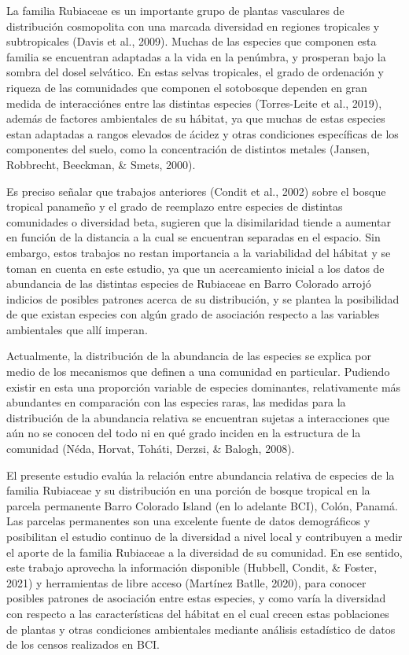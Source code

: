 \documentclass[11pt,]{article}
\begin{document}
La familia Rubiaceae es un importante grupo de plantas vasculares de
distribución cosmopolita con una marcada diversidad en regiones
tropicales y subtropicales (Davis et al., 2009). Muchas de las especies
que componen esta familia se encuentran adaptadas a la vida en la
penúmbra, y prosperan bajo la sombra del dosel selvático. En estas
selvas tropicales, el grado de ordenación y riqueza de las comunidades
que componen el sotobosque dependen en gran medida de interacciónes
entre las distintas especies (Torres-Leite et al., 2019), además de
factores ambientales de su hábitat, ya que muchas de estas especies
estan adaptadas a rangos elevados de ácidez y otras condiciones
específicas de los componentes del suelo, como la concentración de
distintos metales (Jansen, Robbrecht, Beeckman, \& Smets, 2000).

Es preciso señalar que trabajos anteriores (Condit et al., 2002) sobre
el bosque tropical panameño y el grado de reemplazo entre especies de
distintas comunidades o diversidad beta, sugieren que la disimilaridad
tiende a aumentar en función de la distancia a la cual se encuentran
separadas en el espacio. Sin embargo, estos trabajos no restan
importancia a la variabilidad del hábitat y se toman en cuenta en este
estudio, ya que un acercamiento inicial a los datos de abundancia de las
distintas especies de Rubiaceae en Barro Colorado arrojó indicios de
posibles patrones acerca de su distribución, y se plantea la posibilidad
de que existan especies con algún grado de asociación respecto a las
variables ambientales que allí imperan.

Actualmente, la distribución de la abundancia de las especies se explica
por medio de los mecanismos que definen a una comunidad en particular.
Pudiendo existir en esta una proporción variable de especies dominantes,
relativamente más abundantes en comparación con las especies raras, las
medidas para la distribución de la abundancia relativa se encuentran
sujetas a interacciones que aún no se conocen del todo ni en qué grado
inciden en la estructura de la comunidad (Néda, Horvat, Toháti, Derzsi,
\& Balogh, 2008).

El presente estudio evalúa la relación entre abundancia relativa de
especies de la familia Rubiaceae y su distribución en una porción de
bosque tropical en la parcela permanente Barro Colorado Island (en lo
adelante BCI), Colón, Panamá. Las parcelas permanentes son una excelente
fuente de datos demográficos y posibilitan el estudio continuo de la
diversidad a nivel local y contribuyen a medir el aporte de la familia
Rubiaceae a la diversidad de su comunidad. En ese sentido, este trabajo
aprovecha la información disponible (Hubbell, Condit, \& Foster, 2021) y
herramientas de libre acceso (Martínez Batlle, 2020), para conocer
posibles patrones de asociación entre estas especies, y como varía la
diversidad con respecto a las características del hábitat en el cual
crecen estas poblaciones de plantas y otras condiciones ambientales
mediante análisis estadístico de datos de los censos realizados en BCI.
\end{document}

